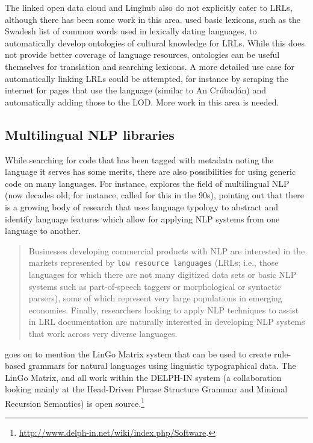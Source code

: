The linked open data cloud and Linghub also do not explicitly cater to LRLs, although there has been some work in this area. \citet{huang2017linking} used basic lexicons, such as the Swadesh list \citep{swadesh1955towards} of common words used in lexically dating languages, to automatically develop ontologies of cultural knowledge for LRLs. While this does not provide better coverage of language resources, ontologies can be useful themselves for translation and searching lexicons. A more detailed use case for automatically linking LRLs could be attempted, for instance by scraping the internet for pages that use the language (similar to An Cr\'{u}bad\'{a}n) and automatically adding those to the LOD. More work in this area is needed.

\subsection{Multilingual NLP libraries}
\label{subsec:popular-open-source-libraries}

While searching for code that has been tagged with metadata noting the language it serves has some merits, there are also possibilities for using generic code on many languages. For instance, \citet{bender2016linguistic} explores the field of multilingual NLP (now decades old; for instance, \citet{kay1997proper} called for this in the 90s), pointing out that there is a growing body of research that uses language typology to abstract and identify language features which allow for applying NLP systems from one language to another.

\begin{quote}
Businesses developing commercial products with NLP are interested in the markets represented by {\tt low resource languages} (LRLs; i.e., those languages for which there are not many digitized data sets or basic NLP systems such as part-of-speech taggers or morphological or syntactic parsers), some of which represent very large populations in emerging economies. Finally, researchers looking to apply NLP techniques to assist in LRL documentation are naturally interested in developing NLP systems that work across very diverse languages.\citep[646]{bender2016linguistic}
\end{quote}

\citet{bender2016linguistic} goes on to mention the LinGo Matrix system \citep{bender2002grammar, drellishak2005coordination} that can be used to create rule-based grammars for natural languages using linguistic typographical data. The LinGo Matrix, and all work within the DELPH-IN system (a collaboration looking mainly at the Head-Driven Phrase Structure Grammar and Minimal Recursion Semantics) is open source.\footnote{\href{http://www.delph-in.net/wiki/index.php/Software}{http://www.delph-in.net/wiki/index.php/Software}. }

